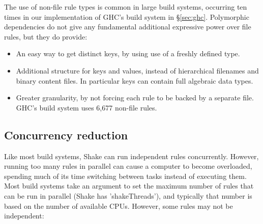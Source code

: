 %
%
%
%

The use of non-file rule types is common in large build systems, occurring ten
times in our implementation of GHC's build system in \S\ref{sec:ghc}.
Polymorphic dependencies do not give any fundamental additional expressive power
over file rules, but they do provide:

\begin{itemize}
\item An easy way to get distinct keys, by using use of a freshly defined type.
\item Additional structure for keys and values, instead of hierarchical
filenames and binary content files. In particular keys can contain full
algebraic data types.
\item Greater granularity, by not forcing each rule to be backed by a separate
file. GHC's build system uses 6,677 non-file rules.
\end{itemize}

\subsection{Concurrency reduction\label{sec:concurrency-reduction}}

Like most build systems, Shake can run independent rules concurrently.
However, running too many rules in parallel can cause a computer to become overloaded,
spending much of its time switching between tasks instead of executing them.
Most build systems take an argument to set the maximum number of rules that can
be run in parallel (Shake has \lst'shakeThreads'), and typically that number
is based on the number of available CPUs. However, some rules may not be
independent:

